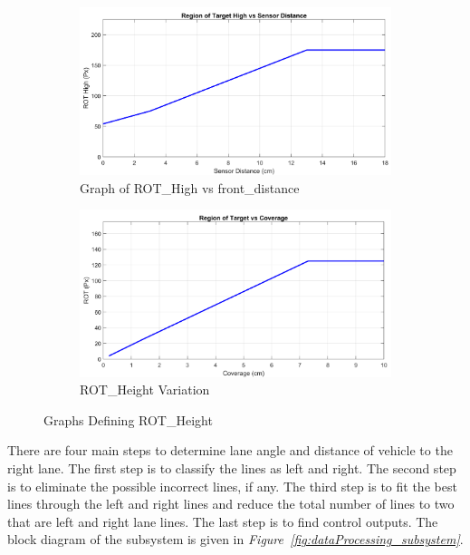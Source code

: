 \documentclass[a4paper,12pt]{article}
\begin{document}
\begin{enumerate}[A.]
\begin{figure}[t!]
	\setlength{\unitlength}{\textwidth} 
		\centering
		\begin{subfigure}{.46\textwidth}
			\centering
			\includegraphics[width=0.44\unitlength]{images/ROT_ROI/ROT_HIGH_crop}
			\caption{ Graph of ROT\_High vs front\_distance}
		\end{subfigure}%
		\begin{subfigure}{.46\textwidth}
			\centering
			\includegraphics[width=0.44\unitlength]{images/ROT_ROI/ROT_crop}
			\caption{ ROT\_Height Variation}
		\end{subfigure}
		\caption{\label{fig:ROT_crop} Graphs Defining ROT\_Height}
	\end{figure}

	There are four main steps to determine lane angle and distance of vehicle to the right lane. The first step is to classify the lines as left and right. The second step is to eliminate the possible incorrect lines, if any. The third step is to fit the best lines through the left and right lines and reduce the total number of lines to two that are left and right lane lines. The last step is to find control outputs. The block diagram of the subsystem is given in \textit{Figure~\ref{fig:dataProcessing_subsystem}}.


\end{enumerate}
\end{document}
